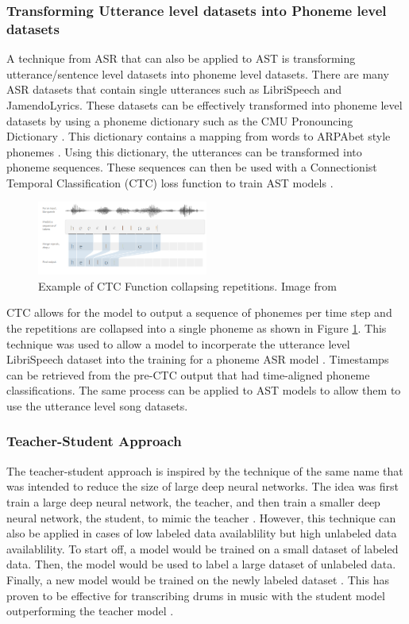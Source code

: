 \documentclass[letterpaper, 12pt]{article}
\begin{document}
\begin{multicols*}{2}
\subsubsection{Transforming Utterance level datasets into Phoneme level datasets} \label{sec:utteranceToPhoneme}
A technique from ASR that can also be applied to AST is transforming utterance/sentence
level datasets into phoneme level datasets. There are many ASR datasets that contain single utterances
such as LibriSpeech and JamendoLyrics. These datasets can be effectively
transformed into phoneme level datasets by using a phoneme dictionary such as the CMU Pronouncing
Dictionary \citep{CMUDict}. This dictionary contains a mapping from words to
ARPAbet style phonemes \citep{CMUDict}. Using this
dictionary, the utterances can be transformed into phoneme sequences. These sequences can then be
used with a Connectionist Temporal Classification (CTC) loss function to train AST models \citep{CTC}.
\begin{figure}
    \centering
    \includegraphics[width=0.5\textwidth]{assets/CTC.png}
    \caption{Example of CTC Function collapsing repetitions. Image from \citep{CTC}}
    \label{fig:CTC}
\end{figure}
CTC allows for the model to output a sequence of phonemes per time step and the
repetitions are collapsed into a single phoneme as shown in Figure \ref{fig:CTC}.
This technique was used to allow a model to incorperate the utterance level LibriSpeech
dataset into the training for a phoneme ASR model \citep{wav2vec}. Timestamps can be
retrieved from the pre-CTC output that had time-aligned phoneme classifications.
The same process can be applied to AST models to allow them to use the utterance level song datasets.

\subsubsection{Teacher-Student Approach} \label{sec:TeacherStudent}
The teacher-student approach is inspired by the technique of the same name that was intended
to reduce the size of large deep neural networks. The idea was first train a large deep neural
network, the teacher, and then train a smaller deep neural network, the student, to mimic the
teacher \citep{TeacherStudent}. However, this technique can also be applied in cases of low labeled
data availablility but high unlabeled data availablility. To start off, a model would be
trained on a small dataset of labeled data. Then, the model would be used to label a large dataset
of unlabeled data. Finally, a new model would be trained on the newly labeled dataset
\citep{DALI}. This has proven to be effective for transcribing drums in music with the student
model outperforming the teacher model \citep{DrumsStudentTeacher}.


\end{multicols*}
\end{document}
